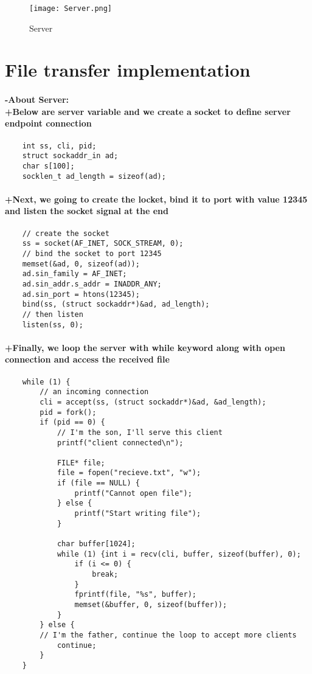 \documentclass{article}
\begin{document}
\begin{figure}[H]
    \centering
    \texttt{[image: Server.png]}
    \caption{Server}
    \label{fig:figure3}
\end{figure}
\section{File transfer implementation}
\paragraph{-About Server: \\
+Below are server variable and we create a socket to define server endpoint connection\\
}
\begin{verbatim}
    int ss, cli, pid;
    struct sockaddr_in ad;
    char s[100];
    socklen_t ad_length = sizeof(ad);
\end{verbatim}
\paragraph{+Next, we going to create the locket, bind it to port with value 12345 and listen the socket signal at the end\\}

\begin{verbatim}
    // create the socket
    ss = socket(AF_INET, SOCK_STREAM, 0);
    // bind the socket to port 12345
    memset(&ad, 0, sizeof(ad));
    ad.sin_family = AF_INET;
    ad.sin_addr.s_addr = INADDR_ANY;
    ad.sin_port = htons(12345);
    bind(ss, (struct sockaddr*)&ad, ad_length);
    // then listen
    listen(ss, 0);
\end{verbatim}
\paragraph{+Finally, we loop the server with while keyword along with open connection and access the received file\\}
\begin{verbatim}
    while (1) {
        // an incoming connection
        cli = accept(ss, (struct sockaddr*)&ad, &ad_length);
        pid = fork();
        if (pid == 0) {
            // I'm the son, I'll serve this client
            printf("client connected\n");

            FILE* file;
            file = fopen("recieve.txt", "w");
            if (file == NULL) {
            	printf("Cannot open file");
            } else {
            	printf("Start writing file");
            }

            char buffer[1024];
            while (1) {int i = recv(cli, buffer, sizeof(buffer), 0);
                if (i <= 0) {
                	break;
                }
                fprintf(file, "%s", buffer);
                memset(&buffer, 0, sizeof(buffer));
            }
        } else {
        // I'm the father, continue the loop to accept more clients
            continue;
        }
    }
\end{verbatim}
\end{document}
